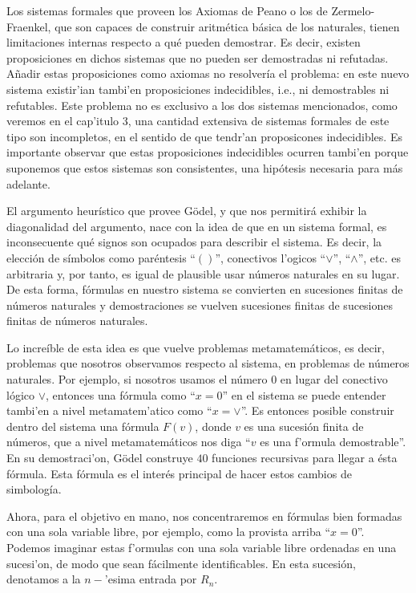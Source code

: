 Los sistemas formales que proveen los Axiomas de Peano o los de Zermelo-Fraenkel, que son capaces de construir aritmética básica de los naturales, tienen limitaciones internas respecto a qué pueden demostrar. Es decir, existen proposiciones en dichos sistemas que no pueden ser demostradas ni refutadas. Añadir estas proposiciones como axiomas no resolvería el problema: en este nuevo sistema existir'ian tambi'en proposiciones indecidibles, i.e., ni demostrables ni refutables. Este problema no es exclusivo a los dos sistemas mencionados, como veremos en el cap'itulo 3, una cantidad extensiva de sistemas formales de este tipo son incompletos, en el sentido de que tendr'an proposicones indecidibles. Es importante observar que estas proposiciones indecidibles ocurren tambi'en porque suponemos que estos sistemas son consistentes, una hipótesis necesaria para más adelante.

El argumento heurístico que provee Gödel, y que nos permitirá exhibir la diagonalidad del argumento, nace con la idea de que en un sistema formal, es inconsecuente qué signos son ocupados para describir el sistema. Es decir, la elección de símbolos como paréntesis \enquote{$()$}, conectivos l'ogicos \enquote{$\lor$}, \enquote{$\land$}, etc. es arbitraria y, por tanto, es igual de plausible usar números naturales en su lugar. De esta forma, fórmulas en nuestro sistema se convierten en sucesiones finitas de números naturales y demostraciones se vuelven sucesiones finitas de sucesiones finitas de números naturales. 

Lo increíble de esta idea es que vuelve problemas metamatemáticos, es decir, problemas que nosotros observamos respecto al sistema, en problemas de números naturales. Por ejemplo, si nosotros usamos el número $0$ en lugar del conectivo lógico $\lor$, entonces una fórmula como \enquote{$x = 0$} en el sistema se puede entender tambi'en a nivel metamatem'atico como \enquote{$x= \lor$}. Es entonces posible construir dentro del sistema una fórmula $F(v)$, donde $v$ es una sucesión finita de números, que a nivel metamatemáticos nos diga \enquote{$v$ es una f'ormula demostrable}. En su demostraci'on, Gödel construye $40$ funciones recursivas para llegar a ésta fórmula. Esta fórmula es el interés principal de hacer estos cambios de simbología. 

Ahora, para el objetivo en mano, nos concentraremos en fórmulas bien formadas con una sola variable libre, por ejemplo, como la provista arriba \enquote{$x=0$}. Podemos imaginar estas f'ormulas con una sola variable libre ordenadas en una sucesi'on, de modo que sean fácilmente identificables. En esta sucesión, denotamos a la $n-$'esima entrada por $R_n$. 

